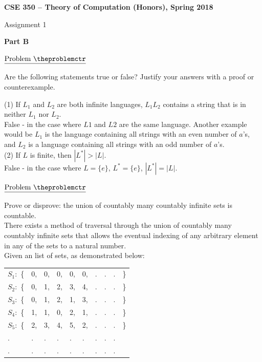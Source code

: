 \documentclass[11pt]{article}
\def\pp{\par\noindent}
\begin{document}
\centerline{\bf CSE 350 -- Theory of Computation (Honors), Spring 2018}
\medskip
\centerline{Assignment 1}
\bigskip
\bigskip


\centerline{\bf Part B}
\addtocounter{problemctr}{1}
\addtocounter{problemctr}{1}
\addtocounter{problemctr}{1}

\addtocounter{problemctr}{1}
\bigskip

\noindent
$\underline{\rm Problem\ \theproblemctr}$\pp Are the following statements true
or false? Justify your answers with a proof or counterexample.

\noindent
(1) If $L_1$ and $L_2$ are both infinite languages, $L_1L_2$ contains a string
that is in neither $L_1$ nor $L_2$.\\

False - in the case where $L1$ and $L2$ are the same language. Another example would be $L_1$ is the language containing all strings with an even number of $a$'s, and $L_2$ is a language containing all strings with an odd number of $a$'s.\\

\noindent
(2) If $L$ is finite, then $|L^*| > |L|$.\\

False - in the case where $L=\{e\}$, $L^*=\{e\}$, $|L^*|=|L|$.

\addtocounter{problemctr}{1}
\bigskip
\noindent
$\underline{\rm Problem\ \theproblemctr}$\pp Prove or disprove: the union of
countably many countably infinite sets is countable.\\


There exists a method of traversal through the union of countably many countably infinite sets that allows the eventual indexing of any arbitrary element in any of the sets to a natural number.\\
Given an list of sets, as demonstrated below:\\

\begin{tabular}{llllllllll}
$S_1:$ \{& 0,& 0, & 0, & 0, & 0, &. &. &. &\}\\
$S_2:$ \{& 0,& 1,& 2,& 3,& 4,&. &. &. &\}\\
$S_3:$ \{& 0,& 1,& 2,& 1,& 3,&. &. &. &\}\\
$S_4:$ \{& 1,& 1,& 0,& 2,& 1,&. &. &. &\}\\
$S_5:$ \{& 2,& 3,& 4,& 5,& 2,&. &. &. &\}\\
. &. &. &. &. &. &. &. &. &\\
. &. &. &. &. &. &. &. &. &\\
\end{tabular}\\
\end{document}
